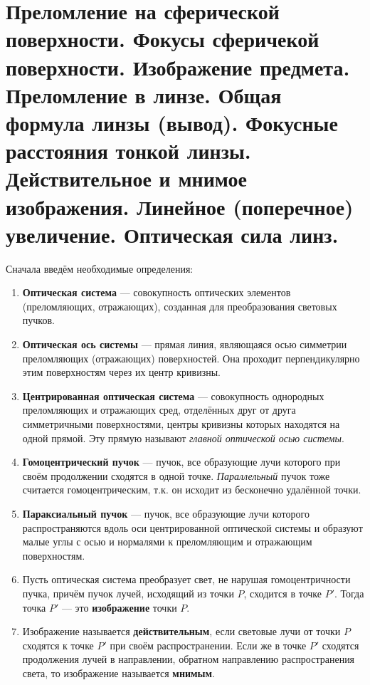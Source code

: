 \section{Преломление на сферической поверхности. Фокусы сферичекой поверхности. Изображение предмета. Преломление в линзе. Общая формула линзы (вывод). Фокусные расстояния тонкой линзы. Действительное и мнимое изображения. Линейное (поперечное) увеличение. Оптическая сила линз.}

Сначала введём необходимые определения:
\begin{enumerate}

\item{\textbf{Оптическая система} — совокупность оптических элементов (преломляющих, отражающих), созданная для преобразования световых пучков.}

\item{\textbf{Оптическая ось системы} — прямая линия, являющаяся осью симметрии преломляющих (отражающих) поверхностей. Она проходит перпендикулярно этим поверхностям через их центр кривизны.}

\item{\textbf{Центрированная оптическая система} — совокупность однородных преломляющих и отражающих сред, отделённых друг от друга симметричными поверхностями, центры кривизны которых находятся на одной прямой. Эту прямую называют \textit{главной оптической осью системы}.}

\item{\textbf{Гомоцентрический пучок} — пучок, все образующие лучи которого при своём продолжении сходятся в одной точке. \textit{Параллельный} пучок тоже считается гомоцентрическим, т.к. он исходит из бесконечно удалённой точки.}

\item{\textbf{Параксиальный пучок} — пучок, все образующие лучи которого распространяются вдоль оси центрированной оптической системы и образуют малые углы с осью и нормалями к преломляющим и отражающим поверхностям.}

\item{Пусть оптическая система преобразует свет, не нарушая гомоцентричности пучка, причём пучок лучей, исходящий из точки $P$, сходится в точке $P'$. Тогда точка $P'$ — это \textbf{изображение} точки $P$.}


\item{Изображение называется \textbf{действительным}, если световые лучи от точки $P$ сходятся к точке $P'$ при своём распространении. Если же в точке $P'$ сходятся продолжения лучей в направлении, обратном направлению распространения света, то изображение называется \textbf{мнимым}.}


\end{enumerate}
